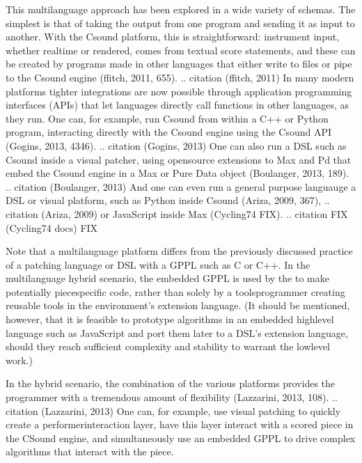 \documentclass[letterpaper,10pt,english]{sphinxmanual}
\begin{document}
\sphinxAtStartPar
This multi\sphinxhyphen{}language approach has been explored in a wide variety of schemas.
The simplest is that of taking the output from one program
and sending it as input to another. With the Csound platform, this
is straightforward: instrument input, whether real\sphinxhyphen{}time or rendered,
comes from textual score statements, and these can be created by programs
made in other languages that either write to files or pipe to the Csound engine (ffitch, 2011, 655).
.. citation (ffitch, 2011)
In many modern platforms tighter integrations are now possible
through application programming interfaces (APIs) that let languages directly call
functions in other languages, as they run.
One can, for example, run Csound from within a C++ or Python program, interacting
directly with the Csound engine using the Csound API (Gogins, 2013, 43\sphinxhyphen{}46).
.. citation (Gogins, 2013)
One can also run a DSL such as Csound inside a visual patcher, using open\sphinxhyphen{}source
extensions to Max and Pd that embed the Csound engine in a Max or Pure Data object (Boulanger, 2013, 189).
.. citation (Boulanger, 2013)
And one can even run a general purpose languauge  a DSL or visual platform,
such as Python inside Csound (Ariza, 2009, 367),
.. citation (Ariza, 2009)
or JavaScript inside Max (Cycling74 FIX).
.. citation FIX (Cycling74 docs) FIX

\sphinxAtStartPar
Note that a multi\sphinxhyphen{}language platform differs from the previously discussed practice of
 a patching language or DSL with a GPPL such as C or C++.
In the multi\sphinxhyphen{}language hybrid scenario, the embedded GPPL is used
by the  to make potentially piece\sphinxhyphen{}specific code,
rather than solely by a tools\sphinxhyphen{}programmer creating reusable tools in the environment’s extension language.
(It should be mentioned, however, that it is feasible to prototype algorithms in an embedded high\sphinxhyphen{}level language such as
JavaScript and port them later to a DSL’s extension language,
should they reach sufficient complexity and stability to warrant the low\sphinxhyphen{}level work.)

\sphinxAtStartPar
In the hybrid scenario, the combination of the various platforms
provides the programmer with a tremendous amount of flexibility (Lazzarini, 2013, 108).
.. citation (Lazzarini, 2013)
One can, for example, use visual patching to quickly
create a performer\sphinxhyphen{}interaction layer, have this layer interact with
a scored piece in the CSound engine, and simultaneously use an embedded GPPL to
drive complex algorithms that interact with the piece.
\end{document}
